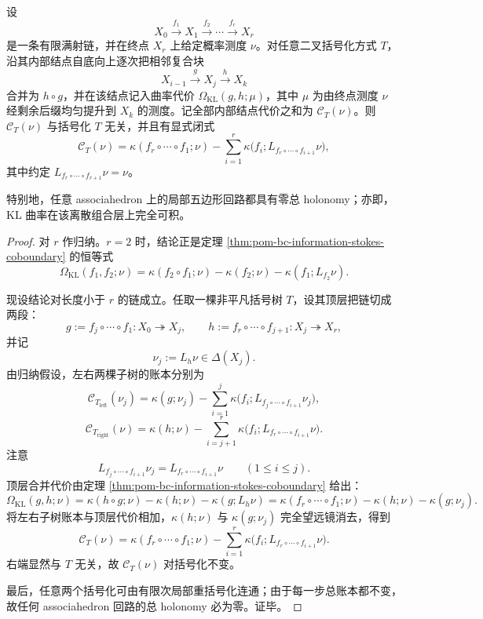 \begin{theorem}\label{thm:conclusion-pom-curvature-ledger-parenthesization-invariance}
设
\[
X_0\xrightarrow{f_1}X_1\xrightarrow{f_2}\cdots\xrightarrow{f_r}X_r
\]
是一条有限满射链，并在终点 \(X_r\) 上给定概率测度 \(\nu\)。对任意二叉括号化方式 \(T\)，沿其内部结点自底向上逐次把相邻复合块
\[
X_{i-1}\xrightarrow{g}X_j\xrightarrow{h}X_k
\]
合并为 \(h\circ g\)，并在该结点记入曲率代价 \(\Omega_{\mathrm{KL}}(g,h;\mu)\)，其中 \(\mu\) 为由终点测度 \(\nu\) 经剩余后缀均匀提升到 \(X_k\) 的测度。记全部内部结点代价之和为 \(\mathcal C_T(\nu)\)。则 \(\mathcal C_T(\nu)\) 与括号化 \(T\) 无关，并且有显式闭式
\[
\mathcal C_T(\nu)
=
\kappa(f_r\circ\cdots\circ f_1;\nu)
-\sum_{i=1}^r
\kappa\!\bigl(f_i;L_{f_r\circ\cdots\circ f_{i+1}}\nu\bigr),
\]
其中约定 \(L_{f_r\circ\cdots\circ f_{r+1}}\nu=\nu\)。

特别地，任意 associahedron 上的局部五边形回路都具有零总 holonomy；亦即，KL 曲率在该离散组合层上完全可积。
\end{theorem}
\begin{proof}
对 \(r\) 作归纳。\(r=2\) 时，结论正是定理 \ref{thm:pom-bc-information-stokes-coboundary} 的恒等式
\[
\Omega_{\mathrm{KL}}(f_1,f_2;\nu)
=
\kappa(f_2\circ f_1;\nu)-\kappa(f_2;\nu)-\kappa(f_1;L_{f_2}\nu).
\]

现设结论对长度小于 \(r\) 的链成立。任取一棵非平凡括号树 \(T\)，设其顶层把链切成两段：
\[
g:=f_j\circ\cdots\circ f_1:X_0\twoheadrightarrow X_j,
\qquad
h:=f_r\circ\cdots\circ f_{j+1}:X_j\twoheadrightarrow X_r,
\]
并记
\[
\nu_j:=L_h\nu\in\Delta(X_j).
\]
由归纳假设，左右两棵子树的账本分别为
\[
\mathcal C_{T_{\mathrm{left}}}(\nu_j)
=
\kappa(g;\nu_j)
-\sum_{i=1}^{j}\kappa\!\bigl(f_i;L_{f_j\circ\cdots\circ f_{i+1}}\nu_j\bigr),
\]
\[
\mathcal C_{T_{\mathrm{right}}}(\nu)
=
\kappa(h;\nu)
-\sum_{i=j+1}^{r}\kappa\!\bigl(f_i;L_{f_r\circ\cdots\circ f_{i+1}}\nu\bigr).
\]
注意
\[
L_{f_j\circ\cdots\circ f_{i+1}}\nu_j
=
L_{f_r\circ\cdots\circ f_{i+1}}\nu
\qquad (1\le i\le j).
\]
顶层合并代价由定理 \ref{thm:pom-bc-information-stokes-coboundary} 给出：
\[
\Omega_{\mathrm{KL}}(g,h;\nu)
=
\kappa(h\circ g;\nu)-\kappa(h;\nu)-\kappa(g;L_h\nu)
=
\kappa(f_r\circ\cdots\circ f_1;\nu)-\kappa(h;\nu)-\kappa(g;\nu_j).
\]
将左右子树账本与顶层代价相加，\(\kappa(h;\nu)\) 与 \(\kappa(g;\nu_j)\) 完全望远镜消去，得到
\[
\mathcal C_T(\nu)
=
\kappa(f_r\circ\cdots\circ f_1;\nu)
-\sum_{i=1}^r
\kappa\!\bigl(f_i;L_{f_r\circ\cdots\circ f_{i+1}}\nu\bigr).
\]
右端显然与 \(T\) 无关，故 \(\mathcal C_T(\nu)\) 对括号化不变。

最后，任意两个括号化可由有限次局部重括号化连通；由于每一步总账本都不变，故任何 associahedron 回路的总 holonomy 必为零。证毕。
\end{proof}

